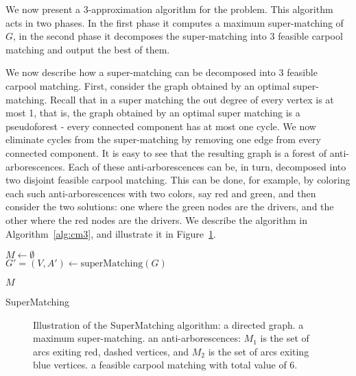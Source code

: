 We now present a 3-approximation algorithm for the \textsc{\CARPOOL{}} problem.
This algorithm acts in two phases.
In the first phase it computes a maximum super-matching of $G$, 
in the second phase it decomposes the super-matching into 3 feasible
carpool matching and output the best of them.

We now describe how a super-matching can be decomposed into 3 feasible carpool
matching.
First, consider the graph obtained by an optimal super-matching.
Recall that in a super matching the out degree of every vertex is at most 1,
that is, the graph obtained by an optimal super matching is a pseudoforest -
every connected component has at most one cycle.
We now eliminate cycles from the super-matching by removing one edge from every
connected component.
It is easy to see that the resulting graph is a forest of anti-arborescences.
Each of these anti-arborescences can be, in turn, decomposed into two disjoint
feasible carpool matching.
This can be done, for example, by coloring each such anti-arborescences with two
colors, say red and green, and then consider the two solutions: one where the
green nodes are the drivers, and the other where the red nodes are the drivers.
We describe the algorithm in Algorithm~\ref{alg:cm3}, 
and illustrate it in Figure~\ref{fig:spanning-bipartite-graph}.   

\begin{algorithm}[t]

$M \leftarrow \emptyset$								\\
$G' = (V, A') \leftarrow \text{superMatching}(G)$				\\


\Return $M$
\caption[A Super Matching]{
\label{alg:cm3}
SuperMatching}
\end{algorithm}

\begin{figure}
\centering
{}
\caption[]{
\label{fig:spanning-bipartite-graph}
Illustration of the SuperMatching algorithm:
 a directed graph. 
 a maximum super-matching.  
 an anti-arborescences:
$M_1$ is the set of arcs exiting red, dashed vertices, 
and $M_2$ is the set of arcs exiting blue vertices.
 a feasible carpool matching with total value of 6.   
}
\end{figure}

